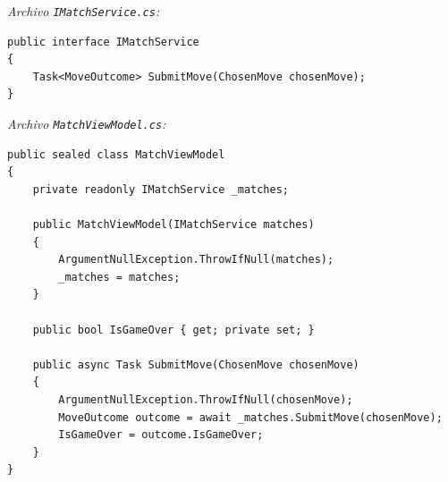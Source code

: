 \textit{Archivo \texttt{IMatchService.cs}:}
\begin{lstlisting}[style=csharpstyle]
public interface IMatchService
{
    Task<MoveOutcome> SubmitMove(ChosenMove chosenMove);
}
\end{lstlisting}

\textit{Archivo \texttt{MatchViewModel.cs}:}
\begin{lstlisting}[style=csharpstyle]
public sealed class MatchViewModel
{
    private readonly IMatchService _matches;

    public MatchViewModel(IMatchService matches)
    {
        ArgumentNullException.ThrowIfNull(matches);
        _matches = matches;
    }

    public bool IsGameOver { get; private set; }

    public async Task SubmitMove(ChosenMove chosenMove)
    {
        ArgumentNullException.ThrowIfNull(chosenMove);
        MoveOutcome outcome = await _matches.SubmitMove(chosenMove);
        IsGameOver = outcome.IsGameOver;
    }
}
\end{lstlisting}
